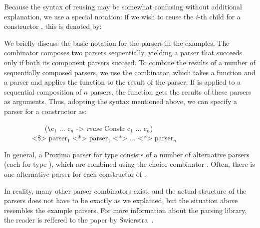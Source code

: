 Because the syntax of reusing may be somewhat confusing without additional explanation, we use a special notation: if we wish to reuse the $i$-th child for a constructor , this is denoted by:

\begin{small}\end{small}

We briefly discuss the basic notation for the parsers in the examples.  The \p{<*>} combinator composes two parsers sequentially, yielding a parser that succeeds only if both its component parsers succeed. To combine the results of a number of sequentially composed parsers, we use the \p{<\$>}
combinator, which takes a function and a parser and applies the function to the result of the parser. If  is applied to a sequential composition of $n$ parsers, the function  gets the results of these parsers as arguments. Thus, adopting the  syntax mentioned above, we can specify a parser for a constructor  as:


\ttfamily\begin{small}\begin{tabbing}
~~~~~~~~~~~ (\verb|\|c$_1$ ... c$_{n}$ -> {\em reuse} Constr c$_1$ ... c$_{n}$)\\
~~~~~~~~<\$> parser$_{1}$ <*> parser$_{1}$ <*> ... <*> parser$_{n}$ \\
\end{tabbing}\end{small}\rmfamily

In general, a Proxima parser for type  consists of a number of alternative parsers (each for type ), which are combined using the choice combinator \p{<|>}. Often, there is one alternative parser for each constructor of . 

In reality, many other parser combinators exist, and the actual structure of the parsers does not have to be exactly as we explained, but the situation above resembles the example parsers. For more information about the parsing library, the reader is reffered to the paper by Swierstra~\cite{swierstra01parsers}.


